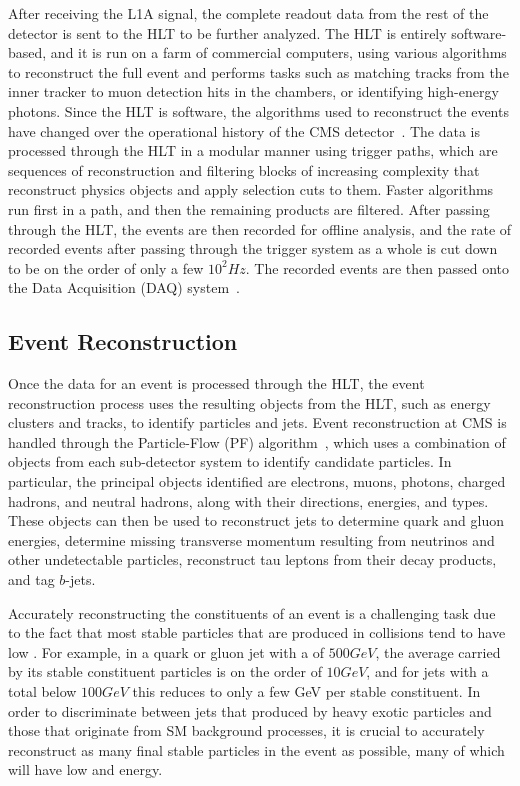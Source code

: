 After receiving the L1A signal, the complete readout data from the rest of the detector is sent to the HLT to be further analyzed.
The HLT is entirely software-based, and it is run on a farm of commercial computers, using various algorithms to reconstruct the full event and performs tasks such as matching tracks from the inner tracker to muon detection hits in the chambers, or identifying high-energy photons.
Since the HLT is software, the algorithms used to reconstruct the events have changed over the operational history of the CMS detector~\cite{Trocino_2014}.
The data is processed through the HLT in a modular manner using trigger paths, which are sequences of reconstruction and filtering blocks of increasing complexity that reconstruct physics objects and apply selection cuts to them.
Faster algorithms run first in a path, and then the remaining products are filtered.
After passing through the HLT, the events are then recorded for offline analysis, and the rate of recorded events after passing through the trigger system as a whole is cut down to be on the order of only a few $10^2\unit{Hz}$.
The recorded events are then passed onto the Data Acquisition (DAQ) system~\cite{Cittolin:578006}.

\subsection{Event Reconstruction}

Once the data for an event is processed through the HLT, the event reconstruction process uses the resulting objects from the HLT, such as energy clusters and tracks, to identify particles and jets.
Event reconstruction at CMS is handled through the Particle-Flow (PF) algorithm~\cite{CMS-PAS-PFT-09-001,CMS-PAS-PFT-10-001}, which uses a combination of objects from each sub-detector system to identify candidate particles.
In particular, the principal objects identified are electrons, muons, photons, charged hadrons, and neutral hadrons, along with their directions, energies, and types.
These objects can then be used to reconstruct jets to determine quark and gluon energies, determine missing transverse momentum \ptmiss resulting from neutrinos and other undetectable particles, reconstruct tau leptons from their decay products, and tag $b$-jets.

Accurately reconstructing the constituents of an event is a challenging task due to the fact that most stable particles that are produced in collisions tend to have low \pt.
For example, in a quark or gluon jet with a \pt of $500\unit{GeV}$, the average \pt carried by its stable constituent particles is on the order of $10\unit{GeV}$, and for jets with a total \pt below $100\unit{GeV}$ this reduces to only a few GeV per stable constituent.
In order to discriminate between jets that produced by heavy exotic particles and those that originate from SM background processes, it is crucial to accurately reconstruct as many final stable particles in the event as possible, many of which will have low \pt and energy.

